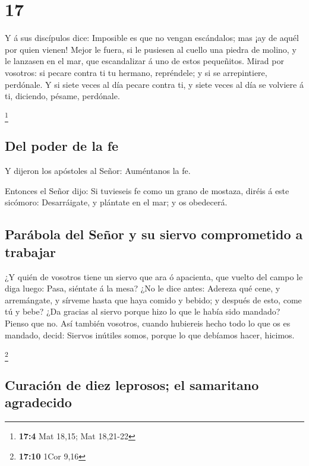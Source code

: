 \hypertarget{section-16}{%
\section{17}\label{section-16}}

 Y á sus discípulos dice: Imposible es que no vengan
escándalos; mas ¡ay de aquél por quien vienen!  Mejor le
fuera, si le pusiesen al cuello una piedra de molino, y le lanzasen en
el mar, que escandalizar á uno de estos pequeñitos.  Mirad
por vosotros: si pecare contra ti tu hermano, repréndele; y si se
arrepintiere, perdónale.  Y si siete veces al día pecare
contra ti, y siete veces al día se volviere á ti, diciendo, pésame,
perdónale.

\footnote{\textbf{17:4} Mat 18,15; Mat 18,21-22}

\hypertarget{del-poder-de-la-fe}{%
\subsection{Del poder de la fe}\label{del-poder-de-la-fe}}

 Y dijeron los apóstoles al Señor: Auméntanos la fe.

 Entonces el Señor dijo: Si tuvieseis fe como un grano de
mostaza, diréis á este sicómoro: Desarráigate, y plántate en el mar; y
os obedecerá.

\hypertarget{paruxe1bola-del-seuxf1or-y-su-siervo-comprometido-a-trabajar}{%
\subsection{Parábola del Señor y su siervo comprometido a
trabajar}\label{paruxe1bola-del-seuxf1or-y-su-siervo-comprometido-a-trabajar}}

 ¿Y quién de vosotros tiene un siervo que ara ó apacienta,
que vuelto del campo le diga luego: Pasa, siéntate á la mesa?
 ¿No le dice antes: Adereza qué cene, y arremángate, y
sírveme hasta que haya comido y bebido; y después de esto, come tú y
bebe?  ¿Da gracias al siervo porque hizo lo que le había
sido mandado? Pienso que no.  Así también vosotros, cuando
hubiereis hecho todo lo que os es mandado, decid: Siervos inútiles
somos, porque lo que debíamos hacer, hicimos.

\footnote{\textbf{17:10} 1Cor 9,16}

\hypertarget{curaciuxf3n-de-diez-leprosos-el-samaritano-agradecido}{%
\subsection{Curación de diez leprosos; el samaritano
agradecido}\label{curaciuxf3n-de-diez-leprosos-el-samaritano-agradecido}}

